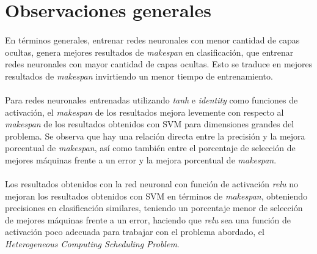 \section{Observaciones generales}

\paragraph{} En términos generales, entrenar redes neuronales con menor cantidad de capas ocultas, genera mejores resultados de \textit{makespan} en clasificación, que entrenar redes neuronales con mayor cantidad de capas ocultas.
Esto se traduce en mejores resultados de \textit{makespan} invirtiendo un menor tiempo de entrenamiento. 

\paragraph{} Para redes neuronales entrenadas utilizando \textit{tanh} e \textit{identity} como funciones de activación, el \textit{makespan} de los resultados mejora levemente con respecto al \textit{makespan} de los resultados obtenidos con SVM para dimensiones grandes del problema.
Se observa que hay una relación directa entre la precisión y la mejora porcentual de \textit{makespan}, así como también entre el porcentaje de selección de mejores máquinas frente a un error y la mejora porcentual de \textit{makespan}. 

\paragraph{} Los resultados obtenidos con la red neuronal con función de activación \textit{relu} no mejoran los resultados obtenidos con SVM en términos de \textit{makespan}, obteniendo precisiones en clasificación similares, teniendo un porcentaje menor de selección de mejores máquinas frente a un error, haciendo que \textit{relu} sea una función de activación poco adecuada para trabajar con el problema abordado, el \textit{Heterogeneous Computing Scheduling Problem}. 
